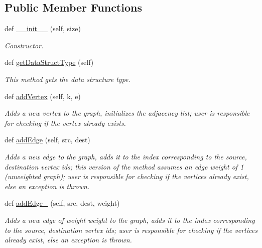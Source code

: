 \subsection*{Public Member Functions}
\begin{DoxyCompactItemize}
\item 
def \hyperlink{class_graph_adj_matrix_1_1_graph_adj_matrix_a18085a97b3716427398dfe0eb2e3db9f}{\+\_\+\+\_\+init\+\_\+\+\_\+} (self, size)
\begin{DoxyCompactList}\small\item\em Constructor. \end{DoxyCompactList}\item 
def \hyperlink{class_graph_adj_matrix_1_1_graph_adj_matrix_aa8d0e8805442fa980d2fa4ec07b29397}{get\+Data\+Struct\+Type} (self)
\begin{DoxyCompactList}\small\item\em This method gets the data structure type. \end{DoxyCompactList}\item 
def \hyperlink{class_graph_adj_matrix_1_1_graph_adj_matrix_a1439f978f7a9a362db75f1a0838783ad}{add\+Vertex} (self, k, e)
\begin{DoxyCompactList}\small\item\em Adds a new vertex to the graph, initializes the adjacency list; user is responsible for checking if the vertex already exists. \end{DoxyCompactList}\item 
def \hyperlink{class_graph_adj_matrix_1_1_graph_adj_matrix_ade007b6875b17bc0e56b08b27ab97de5}{add\+Edge} (self, src, dest)
\begin{DoxyCompactList}\small\item\em Adds a new edge to the graph, adds it to the index corresponding to the source, destination vertex ids; this version of the method assumes an edge weight of 1 (unweighted graph); user is responsible for checking if the vertices already exist, else an exception is thrown. \end{DoxyCompactList}\item 
def \hyperlink{class_graph_adj_matrix_1_1_graph_adj_matrix_aa1f4f5bcc4390fa3b28c5ff7d385c649}{add\+Edge\+\_} (self, src, dest, weight)
\begin{DoxyCompactList}\small\item\em Adds a new edge of weight \textquotesingle{}weight\textquotesingle{} to the graph, adds it to the index corresponding to the source, destination vertex ids; user is responsible for checking if the vertices already exist, else an exception is thrown. \end{DoxyCompactList}\item 

\end{DoxyCompactItemize}
